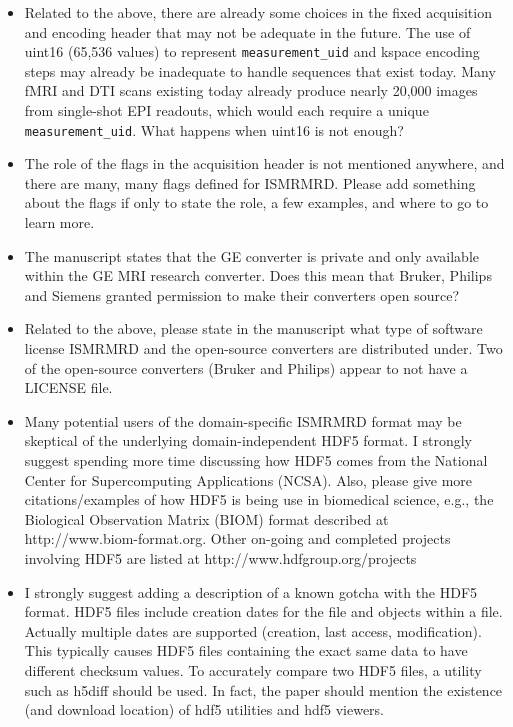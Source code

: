 \documentclass[12pt, draft]{article}
\makeatletter
\def\namedlabel#1#2{\begingroup#2\def\@currentlabel{#2}\phantomsection\label{#1}\endgroup}
\newcommand{\question}[1]{\item[\namedlabel{q#1}{#1}]}
\makeatother
\begin{document}
{\begin{itemize}
\question{R2.6} Related to the above, there are already some choices in the fixed acquisition and encoding header that may not be adequate in the future. The use of uint16 (65,536 values) to represent \texttt{measurement\_uid} and kspace encoding steps may already be inadequate to handle sequences that exist today. Many fMRI and DTI scans existing today already produce nearly 20,000 images from single-shot EPI readouts, which would each require a unique \texttt{measurement\_uid}. What happens when uint16 is not enough?

\question{R2.7} The role of the flags in the acquisition header is not mentioned anywhere, and there are many, many flags defined for ISMRMRD. Please add something about the flags if only to state the role, a few examples, and where to go to learn more.

\question{R2.8} The manuscript states that the GE converter is private and only available within the GE MRI research converter. Does this mean that Bruker, Philips and Siemens granted permission to make their converters open source?

\question{R2.9} Related to the above, please state in the manuscript what type of software license ISMRMRD and the open-source converters are distributed under. Two of the open-source converters (Bruker and Philips) appear to not have a LICENSE file.

\question{R2.10} Many potential users of the domain-specific ISMRMRD format may be skeptical of the underlying domain-independent HDF5 format. I strongly suggest spending more time discussing how HDF5 comes from the National Center for Supercomputing Applications (NCSA). Also, please give more citations/examples of how HDF5 is being use in biomedical science, e.g., the Biological Observation Matrix (BIOM) format described at http://www.biom-format.org. Other on-going and completed projects involving HDF5 are listed at http://www.hdfgroup.org/projects

\question{R2.11} I strongly suggest adding a description of a known gotcha with the HDF5 format. HDF5 files include creation dates for the file and objects within a file. Actually multiple dates are supported (creation, last access, modification). This typically causes HDF5 files containing the exact same data to have different checksum values. To accurately compare two HDF5 files, a utility such as h5diff should be used. In fact, the paper should mention the existence (and download location) of hdf5 utilities and hdf5 viewers.


\end{itemize}}
\end{document}
